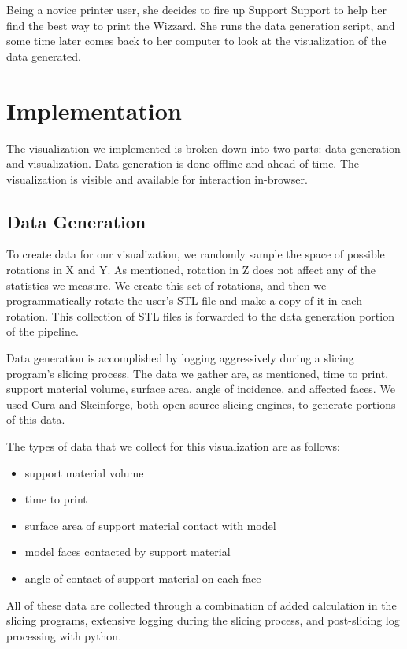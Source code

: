 \documentclass{sigchi}
\begin{document}
Being a novice printer user, she decides to fire up Support Support to help her find the best way to print the Wizzard.  She runs the data generation script, and some time later comes back to her computer to look at the visualization of the data generated.


\section{Implementation}
The visualization we implemented is broken down into two parts: data generation and visualization.  Data generation is done offline and ahead of time.  The visualization is visible and available for interaction in-browser.

\subsection{Data Generation}
To create data for our visualization, we randomly sample the space of possible rotations in X and Y.  As mentioned, rotation in Z does not affect any of the statistics we measure.  We create this set of rotations, and then we programmatically rotate the user's STL file and make a copy of it in each rotation.  This collection of STL files is forwarded to the data generation portion of the pipeline.

Data generation is accomplished by logging aggressively during a slicing program's slicing process.  The data we gather are, as mentioned, time to print, support material volume, surface area, angle of incidence, and affected faces.  We used Cura and Skeinforge, both open-source slicing engines, to generate portions of this data.

The types of data that we collect for this visualization are as follows:
\begin{itemize}
\item support material volume
\item time to print
\item surface area of support material contact with model
\item model faces contacted by support material
\item angle of contact of support material on each face
\end{itemize}

All of these data are collected through a combination of added calculation in the slicing programs, extensive logging during the slicing process, and post-slicing log processing with python.
\end{document}
